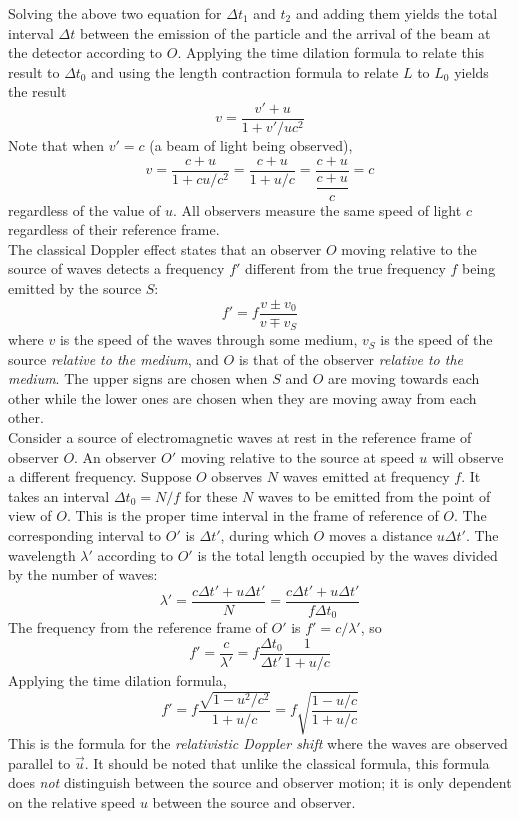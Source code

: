 \documentclass{subfiles}
\begin{document}
				Solving the above two equation for \(\Delta t_1\) and \(t_2\) and adding them yields the total interval \(\Delta t\) between the emission of the particle and the arrival of the beam at the detector according to \(O\). Applying the time dilation formula to relate this result to \(\Delta t_0\) and using the length contraction formula to relate \(L\) to \(L_0\) yields the result
				\[v = \frac{v' + u}{1 + v'/uc^2} \tag{relativistic velocity addition}\]
				Note that when \(v' = c\) (a beam of light being observed),
				\[
					v = \frac{c + u}{1 + cu/c^2}
							= \frac{c + u}{1 + u/c}
							= \frac{c + u}{\dfrac{c + u}{c}}
							= c
				\]
				regardless of the value of \(u\). All observers measure the same speed of light \(c\) regardless of their reference frame. \\
			The classical Doppler effect states that an observer \(O\) moving relative to the source of waves detects a frequency \(f'\) different from the true frequency \(f\) being emitted by the source \(S\):
				\[f' = f\frac{v \pm v_0}{v \mp v_S} \tag{classical Doppler effect}\]
				where \(v\) is the speed of the waves through some medium, \(v_S\) is the speed of the source \textit{relative to the medium}, and \(O\) is that of the observer \textit{relative to the medium}. The upper signs are chosen when \(S\) and \(O\) are moving towards each other while the lower ones are chosen when they are moving away from each other. \\
			Consider a source of electromagnetic waves at rest in the reference frame of observer \(O\). An observer \(O'\) moving relative to the source at speed \(u\) will observe a different frequency. Suppose \(O\) observes \(N\) waves emitted at frequency \(f\). It takes an interval \(\Delta t_0 = N/f\) for these \(N\) waves to be emitted from the point of view of \(O\). This is the proper time interval in the frame of reference of \(O\). The corresponding interval to \(O'\) is \(\Delta t'\), during which \(O\) moves a distance \(u\Delta t'\). The wavelength \(\lambda'\) according to \(O'\) is the total length occupied by the waves divided by the number of waves:
				\[
					\lambda' = \frac{c\Delta t' + u\Delta t'}{N}
						= \frac{c\Delta t' + u\Delta t'}{f\Delta t_0}
				\]
				The frequency from the reference frame of \(O'\) is \(f' = c/\lambda'\), so
				\[
					f' = \frac{c}{\lambda'}
						= f\frac{\Delta t_0}{\Delta t'}\frac{1}{1 + u/c}
				\]
				Applying the time dilation formula,
				\[
					f' = f\frac{\sqrt{1 - u^2/c^2}}{1 + u/c}
						= f\sqrt{\frac{1 - u/c}{1 + u/c}} \tag{relativistic Doppler shift}
				\]
				This is the formula for the \textit{relativistic Doppler shift} where the waves are observed parallel to \(\vec{u}\). It should be noted that unlike the classical formula, this formula does \textit{not} distinguish between the source and observer motion; it is only dependent on the relative speed \(u\) between the source and observer. \\
\end{document}
